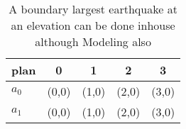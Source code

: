 \documentclass[a4paper]{article}
\begin{document}
\begin{table}
\begin{adjustbox}{width=0.5\columnwidth}
\begin{tabular}{|l|l|l|l|l|}
\hline
\textbf{plan} & \multicolumn{1}{c|}{\textbf{0}} & \multicolumn{1}{c|}{\textbf{1}} & \multicolumn{1}{c|}{\textbf{2}} & \multicolumn{1}{c|}{\textbf{3}} \\ \hline
\textbf{$a_0$}  & (0,0) & (1,0) & (2,0) & (3,0) \\ \hline
\textbf{$a_1$}  & (0,0) & (1,0) & (2,0) & (3,0) \\ \hline
\end{tabular}
\end{adjustbox}
\caption{A boundary largest earthquake at an elevation can be done inhouse although Modeling also 
}
\end{table}
\end{document}
